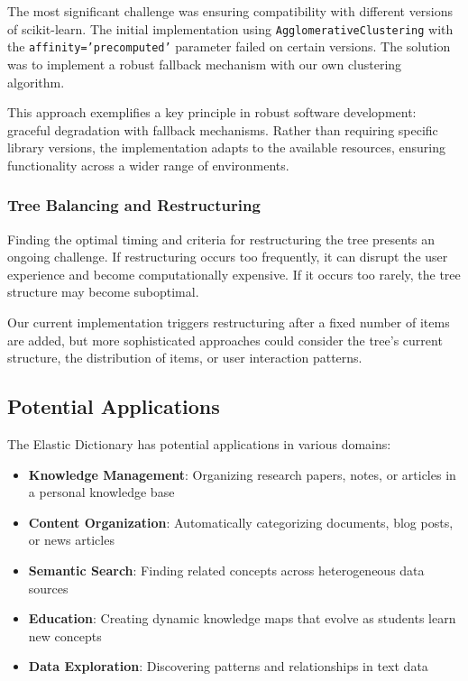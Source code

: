 \documentclass[conference]{IEEEtran}
\begin{document}
The most significant challenge was ensuring compatibility with different versions of scikit-learn. The initial implementation using \texttt{AgglomerativeClustering} with the \texttt{affinity='precomputed'} parameter failed on certain versions. The solution was to implement a robust fallback mechanism with our own clustering algorithm.

This approach exemplifies a key principle in robust software development: graceful degradation with fallback mechanisms. Rather than requiring specific library versions, the implementation adapts to the available resources, ensuring functionality across a wider range of environments.

\subsubsection{Tree Balancing and Restructuring}

Finding the optimal timing and criteria for restructuring the tree presents an ongoing challenge. If restructuring occurs too frequently, it can disrupt the user experience and become computationally expensive. If it occurs too rarely, the tree structure may become suboptimal.

Our current implementation triggers restructuring after a fixed number of items are added, but more sophisticated approaches could consider the tree's current structure, the distribution of items, or user interaction patterns.

\subsection{Potential Applications}

The Elastic Dictionary has potential applications in various domains:

\begin{itemize}
    \item \textbf{Knowledge Management}: Organizing research papers, notes, or articles in a personal knowledge base
    \item \textbf{Content Organization}: Automatically categorizing documents, blog posts, or news articles
    \item \textbf{Semantic Search}: Finding related concepts across heterogeneous data sources
    \item \textbf{Education}: Creating dynamic knowledge maps that evolve as students learn new concepts
    \item \textbf{Data Exploration}: Discovering patterns and relationships in text data
\end{itemize}
\end{document}
